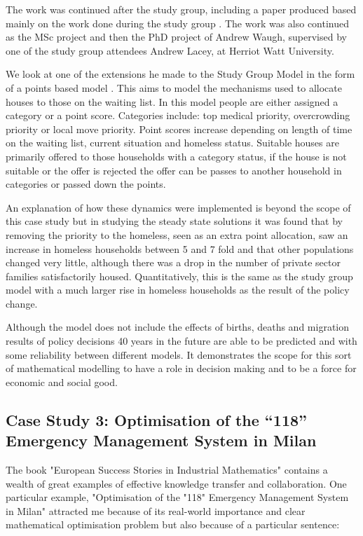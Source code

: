 \documentclass[11pt]{article} %
\begin{document}
	The work was continued after the study group, including a paper produced based mainly on the work done during the study group \cite{Byatt-Smith2003}. The work was also continued as the MSc project and then the PhD project of Andrew Waugh, supervised by one of the study group attendees Andrew Lacey, at Herriot Watt University. 
	
	We look at one of the extensions he made to the Study Group Model in the form of a points based model \cite{Waugh1999}. This aims to model the mechanisms used to allocate houses to those on the waiting list.  In this model people are either assigned a category or a point score. Categories include:  top medical priority, overcrowding priority or local move priority.   Point scores increase depending on length of time on the waiting list, current situation and homeless status. Suitable houses are primarily offered to those households with a category status, if the house is not suitable or the offer is rejected the offer can be passes to another household in categories or passed down the points. 
	
	An explanation of how these dynamics were implemented is beyond the scope of this case study but in studying the steady state solutions it was found that by removing the priority to the homeless, seen as an extra point allocation, saw an increase in homeless households between 5 and 7 fold and that other populations changed very little, although there was a drop in the number of private sector families satisfactorily housed. Quantitatively, this is the same as the study group model with a much larger rise in homeless households as the result of the policy change. 
	
	Although the model does not include the effects of births, deaths and migration results of policy decisions 40 years in the future are able to be predicted and with some reliability between different models. It demonstrates the scope for this sort of mathematical modelling to have a role in decision making and to be a force for economic and social good. 
	
	\subsection{Case Study 3: Optimisation of the “118” Emergency Management System in Milan \label{Milan} }
	The book "European Success Stories in Industrial Mathematics" \cite{European2011} contains a wealth of great examples of effective knowledge transfer and collaboration. One particular example, "Optimisation of the "118" Emergency Management System in Milan" attracted me because of its real-world importance and clear mathematical optimisation problem but also because of a particular sentence: 
	
\end{document}
